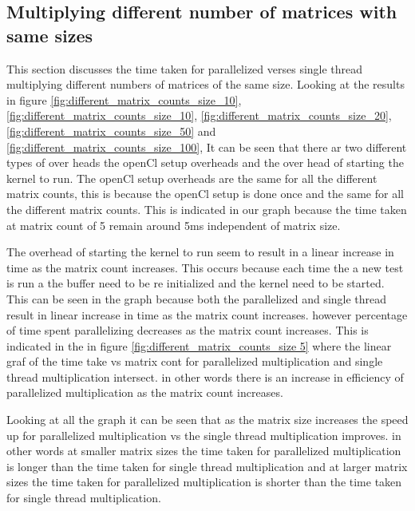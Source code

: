 
\subsection{ Multiplying different number of matrices with same sizes}
This section discusses the time taken for parallelized verses single thread multiplying different numbers of matrices of the same size.
Looking at the results in figure \ref{fig:different_matrix_counts_size_10}, \ref{fig:different_matrix_counts_size_10}, \ref{fig:different_matrix_counts_size_20}, \ref{fig:different_matrix_counts_size_50} and \ref{fig:different_matrix_counts_size_100},
It can be seen that there ar two different types of over heads the openCl setup overheads and the over head of starting the kernel to run.
The openCl setup overheads are the same for all the different matrix counts, this is because the openCl setup is done once and the same for all the different matrix counts.
This is indicated in our graph because the time taken at matrix count of 5 remain around 5ms independent of matrix size.

The overhead of starting the kernel to run seem to result in a linear increase in time  as the matrix count increases.
This occurs because each time the a new test is run a the buffer need to be re initialized and the kernel need to be started.
This can be seen in the graph because both the parallelized and single thread  result in linear increase in time as the matrix count increases.
however percentage of time spent parallelizing decreases as the matrix count increases.
This is indicated in the in figure \ref{fig:different_matrix_counts_size 5} where the linear graf of the time take vs matrix cont for parallelized multiplication
and single thread multiplication intersect. in other words there is an increase in efficiency of parallelized multiplication as the matrix count increases.

Looking at all the graph it can be seen that as the matrix size increases the speed up for parallelized multiplication vs the single thread multiplication improves.
in other words at smaller matrix sizes the time taken for parallelized multiplication is longer than the time taken for single thread multiplication
and at larger matrix sizes the time taken for parallelized multiplication is shorter than the time taken for single thread multiplication.

